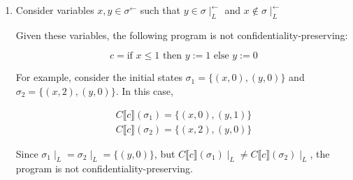 \documentclass{article}
\begin{document}
\begin{enumerate}
\begin{enumerate}
        \begin{equation}
            \begin{aligned}
                \forall \sigma_1, \sigma_2 & \in \Sigma. \big((C \llbracket c_1 \rrbracket \sigma_1) \mid_L = (C \llbracket c_1 \rrbracket \sigma_2) \mid_L \big) \\
                & \Longrightarrow (C \llbracket c_2 \rrbracket (C \llbracket c_1 \rrbracket \sigma_1) \mid_L = C \llbracket c_2 \rrbracket (C \llbracket c_1 \rrbracket \sigma_2) \mid_L)
            \end{aligned}
        \end{equation}

        \((\sigma_1 \mid_L = \sigma_2 \mid_L)\) by assumption.
        (The confidentiality-preserving property says nothing about states whose low-confidentiality variables don't match.)

        Therefore, \( C \llbracket c_1 ; c_2 \rrbracket \) is confidentiality-preserving.
        \( \square \)

        \item %
        Consider variables \(x, y \in \sigma^{\leftarrow} \) such that \(y \in \sigma \mid_L^{\leftarrow} \) and \(x \notin \sigma \mid_L^{\leftarrow} \)

        Given these variables, the following program is not confidentiality-preserving:

        \begin{equation}
            c = \text{if } x \leq 1 \text{ then } y := 1 \text{ else } y := 0
        \end{equation}

        For example, consider the initial states \(\sigma_1 = \{(x, 0), (y, 0)\} \)
        and \(\sigma_2 = \{(x, 2), (y, 0)\} \). In this case,

        \begin{equation}
            \begin{aligned}
                C \llbracket c \rrbracket (\sigma_1) = \{(x, 0), (y, 1)\} \\
                C \llbracket c \rrbracket (\sigma_2) = \{(x, 2), (y, 0)\}
            \end{aligned}
        \end{equation}

        Since \( \sigma_1 \mid_L = \sigma_2 \mid_L = \{ (y, 0) \}\), but \( C \llbracket c \rrbracket (\sigma_1) \mid_L \neq C \llbracket c \rrbracket (\sigma_2) \mid_L \), the program is not confidentiality-preserving.
    \end{enumerate}


\end{enumerate}
\end{document}

